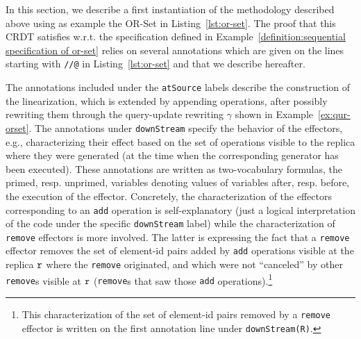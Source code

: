 In this section, we describe a first instantiation of the methodology described above using as example the OR-Set in Listing~\ref{lst:or-set}. The proof that this CRDT satisfies \crdtlin{} w.r.t. the specification defined in Example~\ref{definition:sequential specification of or-set} relies on several annotations which are given on the lines starting with {\tt //@} in Listing~\ref{lst:or-set} and that we describe hereafter.


The annotations included under the \lstinline|atSource| labels describe the construction of the linearization,
which is extended by appending operations, after possibly rewriting
them through the query-update rewriting $\gamma$ shown in Example~\ref{ex:qur-orset}. %
The annotations under \lstinline|downStream| specify the behavior of the effectors, e.g., characterizing their effect based on the set of operations visible to the replica where they were generated
(at the time when the corresponding generator has been executed). 
These annotations are written as two-vocabulary formulas, the primed, resp. unprimed, variables denoting values of variables after, resp. before, the execution of the effector. Concretely, the characterization of the effectors corresponding to an {\tt add} operation is self-explanatory (just a logical interpretation of the code under the specific \lstinline|downStream| label) while the characterization of {\tt remove} effectors is more involved. The latter is expressing the fact that 
a {\tt remove} effector removes the set of element-id pairs added by {\tt add} operations visible at the replica $\mathtt{r}$ where the {\tt remove} originated, and which were not ``canceled'' by other {\tt remove}s visible at $\mathtt{r}$ ({\tt remove}s that saw those {\tt add} operations).\footnote{This characterization of the set of element-id pairs removed by a {\tt remove} effector is written on the first annotation line under \lstinline|downStream(R)|.}

